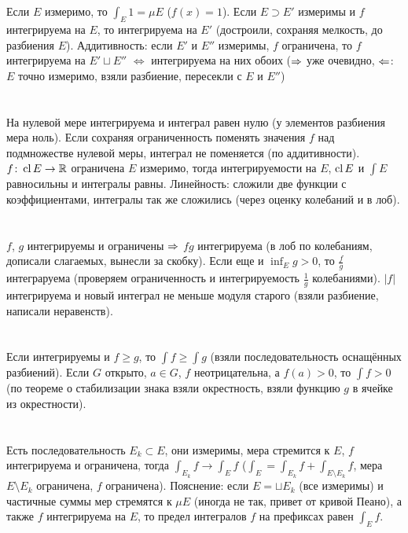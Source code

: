 \section{} %
Если $E$ измеримо, то $\int_E 1 = \mu E$ ($f(x)=1$).
Если $E \supset E'$ измеримы и $f$ интегрируема на $E$, то интегрируема на $E'$ (достроили, сохраняя мелкость, до разбиения $E$).
Аддитивность: если $E'$ и $E''$ измеримы, $f$ ограничена, то $f$ интегрируема на $E' \sqcup E''$ $\iff$ интегрируема на них обоих
($\Rightarrow$ уже очевидно, $\Leftarrow$: $E$ точно измеримо, взяли разбиение, пересекли с $E$ и $E''$)

\section{} %
На нулевой мере интегрируема и интеграл равен нулю (у элементов разбиения мера ноль).
Если сохраняя ограниченность поменять значения $f$ над подмножестве нулевой меры, интеграл не поменяется (по аддитивности).
$f \colon \operatorname{cl} E \to \mathbb{R}$ ограничена $E$ измеримо, тогда интегрируемости на $E$, $\operatorname{cl} E$ и $\int E$ равносильны и интегралы равны.
Линейность: сложили две функции с коэффициентами, интегралы так же сложились (через оценку колебаний и в лоб).

\section{} %
$f$, $g$ интегрируемы и ограничены $\Rightarrow$ $fg$ интегрируема (в лоб по колебаниям, дописали слагаемых, вынесли за скобку).
Если еще и $\inf_E {g} > 0$, то $\frac fg$ интеграруема (проверяем ограниченность и интегрируемость $\frac 1g$ колебаниями).
$|f|$ интегрируема и новый интеграл не меньше модуля старого (взяли разбиение, написали неравенств).

\section{} %
Если интегрируемы и $f \ge g$, то $\int f \ge \int g$ (взяли последовательность оснащённых разбиений).
Если $G$ открыто, $a \in G$, $f$ неотрицательна, а $f(a)>0$, то $\int f > 0$ (по теореме о стабилизации знака взяли окрестность, взяли функцию $g$ в ячейке из окрестности).

\section{} %
Есть последовательность $E_k \subset E$, они измеримы, мера стремится к $E$, $f$ интегрируема и ограничена, тогда $\int_{E_k} f \to \int_E f$ ($\int_E = \int_{E_k} f + \int_{E\setminus E_k} f$, мера $E \setminus E_k$ ограничена, $f$ ограничена).
Пояснение: если $E=\sqcup E_k$ (все измеримы) и частичные суммы мер стремятся к $\mu E$ (иногда не так, привет от кривой Пеано), а также $f$ интегрируема на $E$, то предел интегралов $f$ на префиксах равен $\int_E f$.

